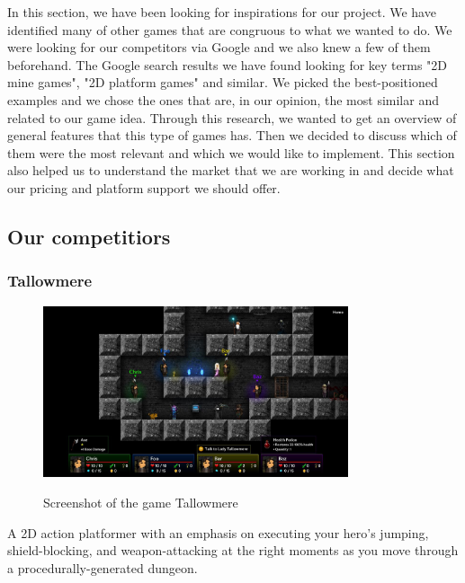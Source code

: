 \documentclass[12p]{article}
\begin{document}
In this section, we have been looking for inspirations for our project. We have identified many of other games that are congruous to what we wanted to do.
We were looking for our competitors via Google and we also knew a few of them beforehand. The Google search results we have found looking for key terms "2D mine games", "2D platform games" and similar. We picked the best-positioned examples and we chose the ones that are, in our opinion, the most similar and related to our game idea. Through this research, we wanted to get an overview of general features that this type of games has. Then we decided to discuss which of them were the most relevant and which we would like to implement. This section also helped us to understand the market that we are working in and decide what our pricing and platform support we should offer.


\subsection{Our competitiors}

\subsubsection[Tallowmere]{Tallowmere \cite{Tallowmere}} \label{sec:StateOfTheArt_Tallowmere}

\begin{figure}[ht]
  \center
  \includegraphics[width=0.8\textwidth]{StateOfTheArtScreenshots/tallowmere.jpeg}
  \label{sec:StateOfTheArt_Screenshots_Tallowmere}
  \caption{Screenshot of the game Tallowmere \cite{Tallowmere}}
\end{figure}

A 2D action platformer with an emphasis on executing your hero's jumping, shield-blocking, and weapon-attacking at the right moments as you move through a procedurally-generated dungeon.
\end{document}
